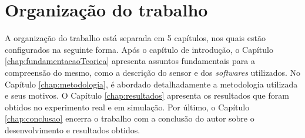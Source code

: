 \section{Organização do trabalho}
\label{sec:organizacaoTrabalho}

A organização do trabalho está separada em 5 capítulos, nos quais estão configurados na seguinte forma.
Após o capítulo de introdução, o Capítulo \ref{chap:fundamentacaoTeorica} apresenta assuntos fundamentais para a compreensão do mesmo, como a descrição do sensor e dos \textit{softwares} utilizados. No Capítulo \ref{chap:metodologia}, é abordado detalhadamente a metodologia utilizada e seus motivos. O Capítulo \ref{chap:resultados} apresenta os resultados que foram obtidos no experimento real e em simulação. 
Por último, o Capítulo \ref{chap:conclusao} encerra o trabalho com a conclusão do autor sobre o desenvolvimento e resultados obtidos.